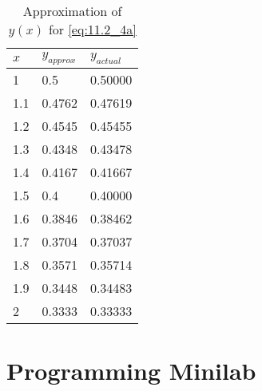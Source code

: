 \documentclass[12pt]{article}
\begin{document}
\begin{table}[h]
  \centering
  \begin{tabularx}{.5\textwidth}{XXX}
    \hline
    $x$ & $y_{approx}$ & $y_{actual}$ \\
    \hline
    1  &    0.5 & 0.50000 \\ 
    1.1  & 0.4762 & 0.47619 \\ 
    1.2  & 0.4545 & 0.45455 \\ 
    1.3  & 0.4348 & 0.43478 \\ 
    1.4  & 0.4167 & 0.41667 \\ 
    1.5  &    0.4 & 0.40000 \\ 
    1.6  & 0.3846 & 0.38462 \\ 
    1.7  & 0.3704 & 0.37037 \\ 
    1.8  & 0.3571 & 0.35714 \\ 
    1.9  & 0.3448 & 0.34483 \\ 
    2  & 0.3333 & 0.33333 \\
    \hline           
  \end{tabularx}
  \caption{Approximation of $y(x)$ for \cref{eq:11.2_4a}}
  \label{tab:4a_data}
\end{table}



\section{Programming Minilab}

  

%   
\end{document}
